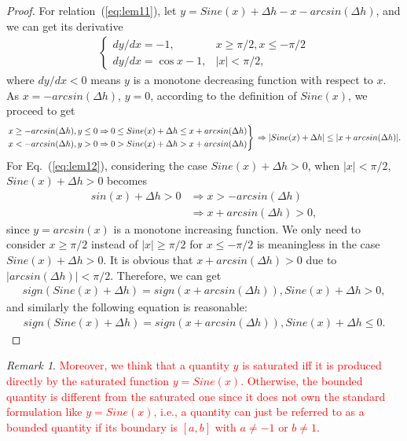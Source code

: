 \documentclass[3p]{elsarticle}
\theoremstyle{plain}
\theoremstyle{remark}
\newtheorem{myrem}{Remark}
\begin{document}
\begin{proof}
For relation~(\ref{eq:lem11}), let $y=Sine(x)+\Delta h-x-arcsin(\Delta h)$, and we can get its derivative
\begin{align}
\begin{cases}
dy/dx = -1,&x\ge\pi/2,x\le-\pi/2\\
dy/dx = \cos x - 1,&\vert x\vert<\pi/2,
\end{cases}
\end{align}
where $dy/dx<0$ means $y$ is a monotone decreasing function with respect to $x$. As $x=-arcsin(\Delta h)$, $y=0$, according to the definition of $Sine(x)$, we proceed to get
$$\left.
\begin{aligned}
x\ge-arcsin(\Delta h), y\le0&\Rightarrow 0\le Sine(x)+\Delta h\le x+arcsin(\Delta h)\\
x<-arcsin(\Delta h), y>0&\Rightarrow 0> Sine(x)+\Delta h>x+arcsin(\Delta h)\end{aligned}\right\}\\\\
\Rightarrow\vert Sine(x)+\Delta h\vert\le\vert x+arcsin(\Delta h)\vert.
$$
For Eq.~(\ref{eq:lem12}), considering the case $Sine(x)+\Delta h>0$, when $\vert x\vert<\pi/2$, $Sine(x)+\Delta h>0$ becomes
\begin{align}
sin(x)+\Delta h>0&\Rightarrow x>-arcsin(\Delta h)\\
&\Rightarrow x+arcsin(\Delta h)>0,
\end{align}
since $y=arcsin(x)$ is a monotone increasing function. We only need to consider $x\ge\pi/2$ instead of $\vert x\vert\ge\pi/2$ for $x\le-\pi/2$ is meaningless in the case $Sine(x)+\Delta h>0$. It is obvious that $x+arcsin(\Delta h)>0$ due to $\vert arcsin(\Delta h)\vert<\pi/2$. Therefore, we can get
\begin{align}
sign(Sine(x)+\Delta h)=sign(x+arcsin(\Delta h)),Sine(x)+\Delta h>0,
\end{align}
and similarly the following equation is reasonable:
\begin{align}
sign(Sine(x)+\Delta h)=sign(x+arcsin(\Delta h)),Sine(x)+\Delta h\le0.
\end{align}
\end{proof}
\begin{myrem}\textcolor{red}{Moreover, we think that a quantity $y$ is saturated iff it is produced directly by the saturated function $y=Sine(x)$. Otherwise, the bounded quantity is different from the saturated one since it does not own the standard formulation like $y=Sine(x)$, i.e., a quantity can just be referred to as a bounded quantity if its boundary is $[a,b]$ with $a\neq -1$ or $b\neq 1$.}
\end{myrem}
\end{document}
